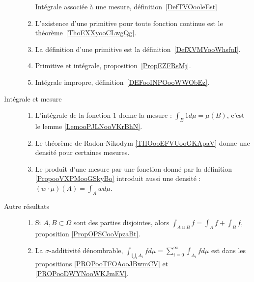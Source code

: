 \begin{description}
\begin{enumerate}
		            Intégrale associée à une mesure, définition~\ref{DefTVOooleEst}
		      \item
		            L'existence d'une primitive pour toute fonction continue est le théorème~\ref{ThoEXXyooCLwgQg}.
		      \item
		            La définition d'une primitive est la définition~\ref{DefXVMVooWhsfuI}.
		      \item
		            Primitive et intégrale, proposition~\ref{PropEZFRsMj}.
		      \item
		            Intégrale impropre, définition~\ref{DEFooINPOooWWObEz}.
	      \end{enumerate}
	\item[Intégrale et mesure]
	      \begin{enumerate}
		      \item
		            L'intégrale de la fonction \( 1\) donne la mesure : \( \int_B1d\mu=\mu(B)\), c'est le lemme \ref{LemooPJLNooVKrBhN}.
		      \item
		            Le théorème de Radon-Nikodym \ref{THOooEFVUooGKApaV} donne une densité pour certaines mesures.
		      \item
		            Le produit d'une mesure par une fonction donné par la définition \ref{PropooVXPMooGSkyBo} introduit aussi une densité : \( (w\cdot \mu)(A)=\int_Awd\mu\).
	      \end{enumerate}

	\item[Autre résultats]
	      \begin{enumerate}
		      \item
		            Si \( A,B\subset \Omega\) sont des parties disjointes, alors \( \int_{A\cup B}f=\int_Af+\int_Bf\), proposition \ref{PropOPSCooVpzaBt}.
		      \item
		            La \( \sigma\)-additivité dénombrable, \( \int_{\bigcup_iA_i}fd\mu=\sum_{i=0}^{\infty}\int_{A_i}fd\mu\) est dans les propositions \ref{PROPooTFOAooJBwmCV} et \ref{PROPooDWYNooWKJmEV}.
	      \end{enumerate}
\end{description}

